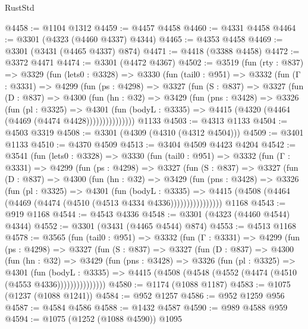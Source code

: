 \begin{lexlean}{RustStd}
\begin{coremodule}
@4458 := @1104 @1312
@4459 := @4457 @4458
@4460 := @4331 @4458
@4464 := @3301 (@4323 (@4460 @4337) @4344)
@4465 := @4353 @4458
@4469 := @3301 (@3431 (@4465 @4337) @874)
@4471 := @4418 (@3388 @4458)
@4472 := @3372 @4471
@4474 := @3301 (@4472 @4367)
@4502 := @3519
    (fun (rty : @837) =>
    @3329
      (fun (lets0 : @3328) =>
      @3330
        (fun (tail0 : @951) =>
        @3332
          (fun (Γ : @3331) =>
          @4299
            (fun (ps : @4298) =>
            @3327
              (fun (S : @837) =>
              @3327
                (fun (D : @837) =>
                @4300
                  (fun (hn : @32) =>
                  @3429
                    (fun (pns : @3428) =>
                    @3326
                      (fun (pl : @3325) =>
                      @4301
                        (fun (bodyL : @3335) =>
                        @4415 (@4320 (@4464 (@4469 (@4474 @4428)))))))))))))))
    @1133
@4503 := @4313 @1133
@4504 := @4503 @3319
@4508 := @3301 (@4309 (@4310 (@4312 @4504)))
@4509 := @3401 @1133
@4510 := @4370 @4509
@4513 := @3404 @4509 @4423 @4204
@4542 := @3541
    (fun (lets0 : @3328) =>
    @3330
      (fun (tail0 : @951) =>
      @3332
        (fun (Γ : @3331) =>
        @4299
          (fun (ps : @4298) =>
          @3327
            (fun (S : @837) =>
            @3327
              (fun (D : @837) =>
              @4300
                (fun (hn : @32) =>
                @3429
                  (fun (pns : @3428) =>
                  @3326
                    (fun (pl : @3325) =>
                    @4301
                      (fun (bodyL : @3335) =>
                      @4415 (@4508 (@4464 (@4469 (@4474 (@4510 (@4513 @4334 @4336))))))))))))))))
    @1168
@4543 := @919 @1168
@4544 := @4543 @4336
@4548 := @3301 (@4323 (@4460 @4544) @4344)
@4552 := @3301 (@3431 (@4465 @4544) @874)
@4553 := @4513 @1168
@4578 := @3565
    (fun (tail0 : @951) =>
    @3332
      (fun (Γ : @3331) =>
      @4299
        (fun (ps : @4298) =>
        @3327
          (fun (S : @837) =>
          @3327
            (fun (D : @837) =>
            @4300
              (fun (hn : @32) =>
              @3429
                (fun (pns : @3428) =>
                @3326
                  (fun (pl : @3325) =>
                  @4301
                    (fun (bodyL : @3335) =>
                    @4415 (@4508 (@4548 (@4552 (@4474 (@4510 (@4553 @4336)))))))))))))))
@4580 := @1174 (@1088 @1187)
@4583 := @1075 (@1237 (@1088 @1241))
@4584 := @952 @1257
@4586 := @952 @1259 @956
@4587 := @4584 @4586
@4588 := @1432 @4587
@4590 := @989 @4588 @959
@4594 := @1075 (@1252 (@1088 @4590)) @1095

\end{coremodule}
\end{lexlean}
